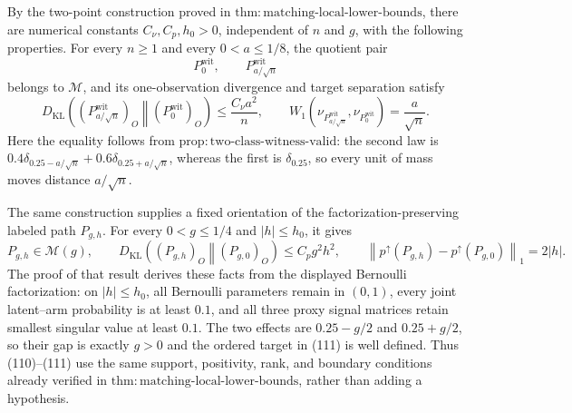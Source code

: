 By the two-point construction proved in \(\mathrm{thm:matching\text{-}local\text{-}lower\text{-}bounds}\), there are numerical constants \(C_{\nu},C_p,h_0>0\), independent of \(n\) and \(g\), with the following properties.  For every \(n\ge 1\) and every \(0<a\le 1/8\), the quotient pair
\[
P_0^{\mathrm{wit}},\qquad P_{a/\sqrt n}^{\mathrm{wit}}
\]
belongs to \(\mathcal M\), and its one-observation divergence and target separation satisfy
\[
D_{\mathrm{KL}}\!\left((P_{a/\sqrt n}^{\mathrm{wit}})_O
 \middle\Vert (P_0^{\mathrm{wit}})_O\right)
 \le \frac{C_{\nu}a^2}{n},
\qquad
W_1\!\left(\nu_{P_{a/\sqrt n}^{\mathrm{wit}}},
             \nu_{P_0^{\mathrm{wit}}}\right)
=\frac a{\sqrt n}.                                                     \tag{110}
\]
Here the equality follows from \(\mathrm{prop:two\text{-}class\text{-}witness\text{-}valid}\): the second law is \(0.4\delta_{0.25-a/\sqrt n}+0.6\delta_{0.25+a/\sqrt n}\), whereas the first is \(\delta_{0.25}\), so every unit of mass moves distance \(a/\sqrt n\).

The same construction supplies a fixed orientation of the factorization-preserving labeled path \(P_{g,h}\).  For every \(0<g\le 1/4\) and \(|h|\le h_0\), it gives
\[
P_{g,h}\in\mathcal M(g),
\qquad
D_{\mathrm{KL}}\!\left((P_{g,h})_O\middle\Vert(P_{g,0})_O\right)
 \le C_p g^2h^2,
\qquad
\left\|p^{\uparrow}(P_{g,h})-p^{\uparrow}(P_{g,0})\right\|_1=2|h|.     \tag{111}
\]
The proof of that result derives these facts from the displayed Bernoulli factorization: on \(|h|\le h_0\), all Bernoulli parameters remain in \((0,1)\), every joint latent--arm probability is at least \(0.1\), and all three proxy signal matrices retain smallest singular value at least \(0.1\).  The two effects are \(0.25-g/2\) and \(0.25+g/2\), so their gap is exactly \(g>0\) and the ordered target in (111) is well defined.  Thus (110)--(111) use the same support, positivity, rank, and boundary conditions already verified in \(\mathrm{thm:matching\text{-}local\text{-}lower\text{-}bounds}\), rather than adding a hypothesis.

